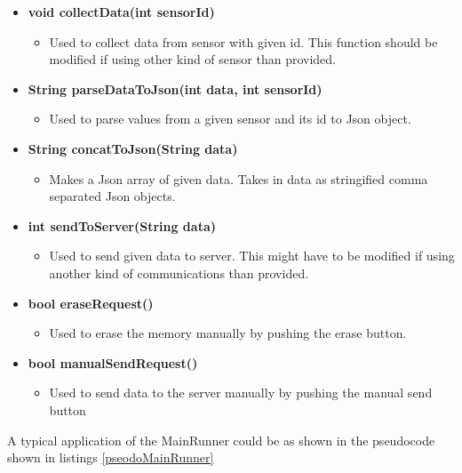 \begin{itemize}
    \item \textbf{void collectData(int sensorId)}
        \begin{itemize}
            \item Used to collect data from sensor with given id. This function should
                  be modified if using other kind of sensor than provided.
        \end{itemize}
    \item \textbf{String parseDataToJson(int data, int sensorId)}
        \begin{itemize}
            \item Used to parse values from a given sensor and its id to Json object.
        \end{itemize}
    \item \textbf{String concatToJson(String data)}
        \begin{itemize}
            \item Makes a Json array of given data. Takes in data as stringified comma 
                  separated Json objects. 
        \end{itemize}
    \item \textbf{int sendToServer(String data)}
        \begin{itemize}
            \item Used to send given data to server. This might have to be modified
                  if using another kind of communications than provided.
        \end{itemize}
    \item \textbf{bool eraseRequest()}
        \begin{itemize}
            \item Used to erase the memory manually by pushing the erase button.
        \end{itemize}
    \item \textbf{bool manualSendRequest()}
        \begin{itemize}
            \item Used to send data to the server manually by pushing the manual send 
                  button
        \end{itemize}
\end{itemize}
A typical application of the MainRunner could be as shown in the pseudocode shown in listings \ref{pseodoMainRunner}

